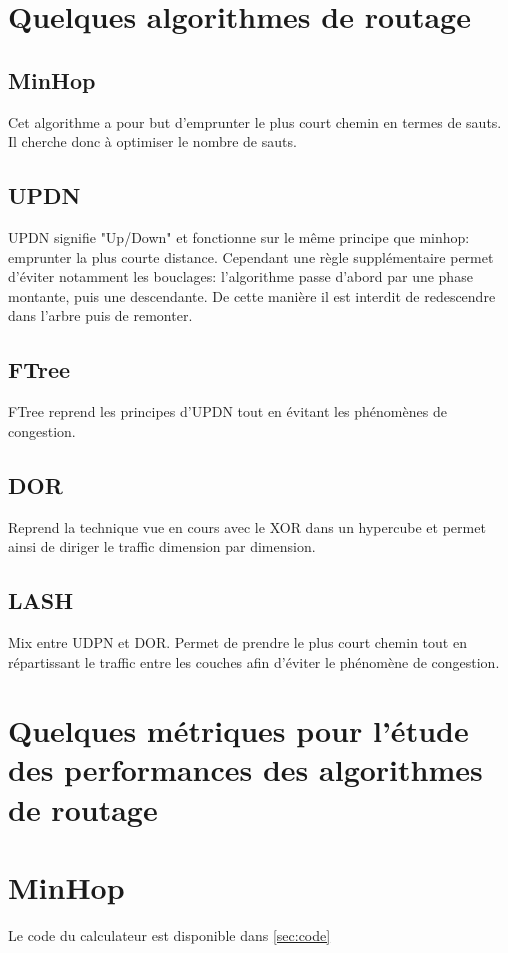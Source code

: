 \documentclass{report}
\begin{document}
		\section{Quelques algorithmes de routage}
			\subsection{MinHop}
				Cet algorithme a pour but d'emprunter le plus court chemin en termes de sauts. Il cherche donc à optimiser le nombre de sauts.
				
			\subsection{UPDN}
				UPDN signifie "Up/Down" et fonctionne sur le même principe que minhop: emprunter la plus courte distance. Cependant une règle supplémentaire permet d'éviter notamment les bouclages: l'algorithme passe d'abord par une phase montante, puis une descendante. De cette manière il est interdit de redescendre dans l'arbre puis de remonter.
				
			\subsection{FTree}
				FTree reprend les principes d'UPDN tout en évitant les phénomènes de congestion.
				
			\subsection{DOR}
				Reprend la technique vue en cours avec le XOR dans un hypercube et permet ainsi de diriger le traffic dimension par dimension.
			
			\subsection{LASH}
				Mix entre UDPN et DOR. Permet de prendre le plus court chemin tout en répartissant le traffic entre les couches afin d'éviter le phénomène de congestion.
		
		\section{Quelques métriques pour l’étude des performances des algorithmes de routage}
			\section{MinHop}
				Le code du calculateur est disponible dans \autoref{sec:code}
				
\end{document}
